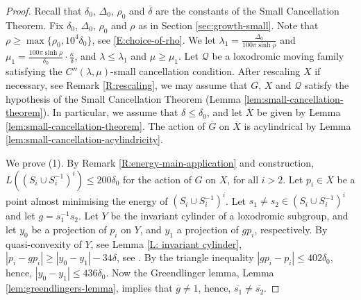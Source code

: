 \documentclass[leqno,a4paper,10pt]{amsart}
\theoremstyle{plain}
\theoremstyle{definition}
\theoremstyle{remark}
\newcommand{\cX}{\dot{X}}
\let\le\leqslant
\let\ge\geqslant
\begin{document}
\begin{proof} Recall that $\delta_0$, $\Delta_0$, $\rho_0$ and $\overline \delta$ are the constants of the Small Cancellation Theorem. 
Fix $\delta_0$, $\Delta_0$, $\rho_0$ and $\rho$ as in Section \ref{sec:growth-small}. Note that $\rho \geqslant \max\{\rho_0,10^4\delta_0\}$, see \eqref{E:choice-of-rho}. We let $\lambda_1=\frac{\Delta_0}{100\pi\sinh\rho}$ and $\mu_1= \frac{100\pi \sinh \rho}{\delta_0}\cdot \frac{\kappa}{\delta}$, and $\lambda\le \lambda_1$  and $ \mu\ge \mu_1.$ Let $\mathcal Q$ be a loxodromic moving family satisfying the $C''(\lambda,\mu)$-small cancellation condition. After rescaling $X$ if necessary, see Remark \ref{R:rescaling}, we may assume that $G$, $X$ and $\mathcal Q$ satisfy the hypothesis of the Small Cancellation Theorem (Lemma \ref{lem:small-cancellation-theorem}). In particular, we assume that $\delta\leqslant \delta_0$, and let $\overline X$ be given by  Lemma \ref{lem:small-cancellation-theorem}. The action of $\overline G$ on $\overline X$ is acylindrical by Lemma \ref{lem:small-cancellation-acylindricity}. 


We prove (1). By Remark \ref{R:energy-main-application} and construction, $L((S_i\cup S_i^{-1})^i)\le 200 \delta_0$ for the action of $G$ on $X$, for all $i>2$. Let $p_i\in X$ be a point almost minimising the energy of $(S_i\cup S_i^{-1})^i$. Let $s_1\not=s_2\in (S_i\cup S_i^{-1})^i$ and let $g=s_1^{-1}s_2$. Let $Y$ be the invariant cylinder of a loxodromic subgroup, and let $y_0$ be a projection of $p_i$ on $Y$, and $y_1$ a projection of $gp_i$, respectively. By quasi-convexity of $Y$, see Lemma \ref{L: invariant cylinder}, $|p_i-gp_i|\geqslant |y_0-y_1|- 34\delta$, see \cite[Chapitre 10, Proposition 2.1]{coornaert_geometrie_1990}. By the triangle inequality $|gp_i-p_i|\leqslant 402\delta_0$, hence, $|y_0-y_1|\leqslant 436\delta_0$. Now the Greendlinger lemma, Lemma \ref{lem:greendlingers-lemma}, implies that $\overline g\not =1$, hence, $\overline {s_1}\not=\overline {s_2}$.  



\end{proof}
\end{document}
